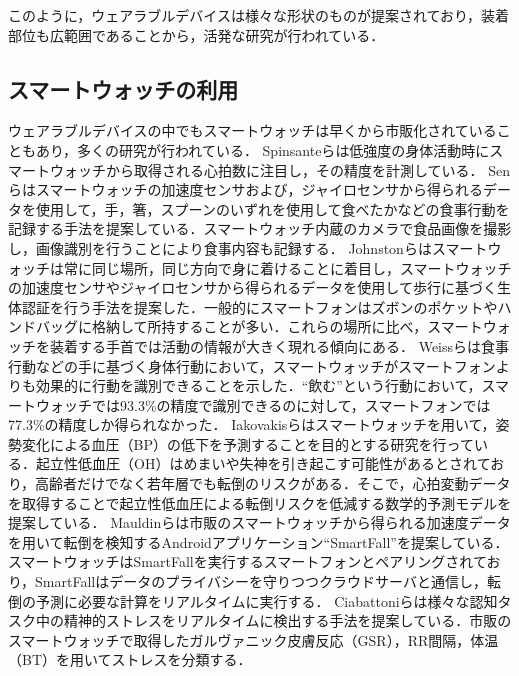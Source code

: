 \documentclass[Japanese,noauthor]{dicomopapers}
\begin{document}
このように，ウェアラブルデバイスは様々な形状のものが提案されており，装着部位も広範囲であることから，活発な研究が行われている．


\subsection{スマートウォッチの利用}
ウェアラブルデバイスの中でもスマートウォッチは早くから市販化されていることもあり，多くの研究が行われている．
Spinsanteら\cite{accuracy_in_low_intensity}は低強度の身体活動時にスマートウォッチから取得される心拍数に注目し，その精度を計測している．
Senら\cite{eating_recognition}はスマートウォッチの加速度センサおよび，ジャイロセンサから得られるデータを使用して，手，箸，スプーンのいずれを使用して食べたかなどの食事行動を記録する手法を提案している．スマートウォッチ内蔵のカメラで食品画像を撮影し，画像識別を行うことにより食事内容も記録する．
Johnstonら\cite{smartwatch_walk_authentication}はスマートウォッチは常に同じ場所，同じ方向で身に着けることに着目し，スマートウォッチの加速度センサやジャイロセンサから得られるデータを使用して歩行に基づく生体認証を行う手法を提案した．一般的にスマートフォンはズボンのポケットやハンドバッグに格納して所持することが多い．これらの場所に比べ，スマートウォッチを装着する手首では活動の情報が大きく現れる傾向にある．
Weissら\cite{smartwatch_activity_recognition}は食事行動などの手に基づく身体行動において，スマートウォッチがスマートフォンよりも効果的に行動を識別できることを示した．``飲む''という行動において，スマートウォッチでは93.3\%の精度で識別できるのに対して，スマートフォンでは77.3\%の精度しか得られなかった．
Iakovakisら\cite{oh_detection}はスマートウォッチを用いて，姿勢変化による血圧（BP）の低下を予測することを目的とする研究を行っている．起立性低血圧（OH）はめまいや失神を引き起こす可能性があるとされており，高齢者だけでなく若年層でも転倒のリスクがある．そこで，心拍変動データを取得することで起立性低血圧による転倒リスクを低減する数学的予測モデルを提案している．
Mauldinら\cite{smartfall}は市販のスマートウォッチから得られる加速度データを用いて転倒を検知するAndroidアプリケーション``SmartFall''を提案している．スマートウォッチはSmartFallを実行するスマートフォンとペアリングされており，SmartFallはデータのプライバシーを守りつつクラウドサーバと通信し，転倒の予測に必要な計算をリアルタイムに実行する．
Ciabattoniら\cite{smartwatch_stress_detection}は様々な認知タスク中の精神的ストレスをリアルタイムに検出する手法を提案している．市販のスマートウォッチで取得したガルヴァニック皮膚反応（GSR），RR間隔，体温（BT）を用いてストレスを分類する．\par
\end{document}
